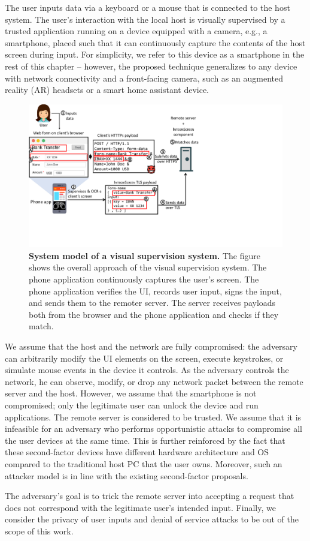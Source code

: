 The user inputs data via a keyboard or a mouse that is connected to the host system. The user's interaction with the local host is visually supervised by a trusted application running on a device equipped with a camera, e.g., a smartphone, placed such that it can continuously capture the contents of the host screen during input. 
For simplicity, we refer to this device as a smartphone in the rest of this chapter -- however, the proposed technique generalizes to any device with network connectivity and a front-facing camera, such as an augmented reality (AR) headsets or a smart home assistant device.

\begin{figure}[t]
	\centering
    \includegraphics[trim={0 3.7cm 11.2cm 0},clip,width=\linewidth]{chapters/IntegriScreen/newImg/overview-vertical.pdf}
	\caption[System model of a visual supervision system]{\textbf{System model of a visual supervision system.} The figure shows the overall approach of the visual supervision system. The phone application continuously captures the user's screen. The phone application verifies the UI, records user input, signs the input, and sends them to the remoter server. The server receives payloads both from the browser and the phone application and checks if they match.}
	\label{integriscreen:fig:systemModel}
\end{figure}


We assume that the host and the network are fully compromised: the adversary can arbitrarily modify the UI elements on the screen, execute keystrokes, or simulate mouse events in the device it controls. As the adversary controls the network, he can observe, modify, or drop any network packet between the remote server and the host.
However, we assume that the smartphone is not compromised; only the legitimate user can unlock the device and run applications. The remote server is considered to be trusted. 
We assume that it is infeasible for an adversary who performs opportunistic attacks to compromise all the user devices at the same time. This is further reinforced by the fact that these second-factor devices have different hardware architecture and OS compared to the traditional host PC that the user owns. Moreover, such an attacker model is in line with the existing second-factor proposals.

The adversary's goal is to trick the remote server into accepting a request that does not correspond with the legitimate user's intended input.
Finally, we consider the privacy of user inputs and denial of service attacks to be out of the scope of this work.